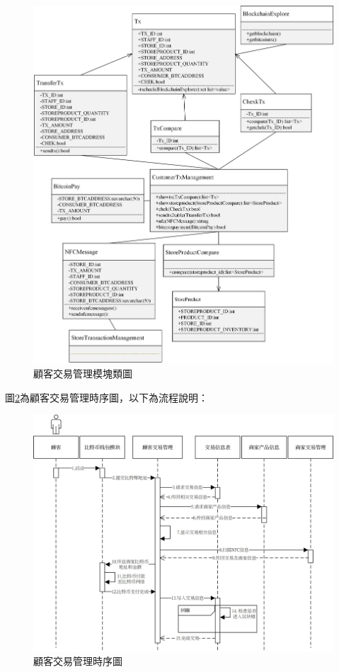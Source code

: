 	\begin{figure}[!htbp]
		\centering
		\includegraphics[width = 1\textwidth]{c4.jpg}
		\caption{顧客交易管理模塊類圖}\label{c4}
	\end{figure}

	

	圖\ref{time5}為顧客交易管理時序圖，以下為流程說明：

	\begin{figure}[!htbp]
		\centering
		\includegraphics[width = 1\textwidth]{time5.jpg}
		\caption{顧客交易管理時序圖}\label{time5}
	\end{figure}

